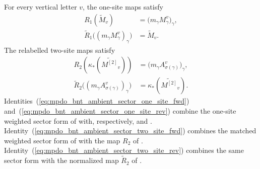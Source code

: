 \begin{lemma}
    \label{thm:mpdo_bnt_ambient_sector_tensor_letters}
    \leanok
    For every vertical letter $v$, the one-site maps satisfy
    \begin{align}
        R_1(\widetilde M_v)
         & =\bigl(m_\gamma M_\gamma^v\bigr)_\gamma,
        \label{eq:mpdo_bnt_ambient_sector_one_site_fwd}
        \\
        \widetilde R_1\bigl((m_\gamma M_\gamma^v)_\gamma\bigr)
         & =\widetilde M_v.
        \label{eq:mpdo_bnt_ambient_sector_one_site_rev}
    \end{align}
    The relabelled two-site maps satisfy
    \begin{align}
        R_2\!\left(\kappa_\ast(\widetilde{M^{[2]}}_v)\right)
         & =\bigl(m_\gamma A_{\sigma(\gamma)}^v\bigr)_\gamma,
        \label{eq:mpdo_bnt_ambient_sector_two_site_fwd}
        \\
        \widetilde R_2\bigl((m_\gamma A_{\sigma(\gamma)}^v)_\gamma\bigr)
         & =\kappa_\ast(\widetilde{M^{[2]}}_v).
        \label{eq:mpdo_bnt_ambient_sector_two_site_rev}
    \end{align}
    Identities~(\ref{eq:mpdo_bnt_ambient_sector_one_site_fwd}) and~(\ref{eq:mpdo_bnt_ambient_sector_one_site_rev}) combine the one-site weighted
    sector form of
    \cite[Appendix~C.4, lines~2048--2051]{Cirac2016MPDO_arXiv} with,
    respectively,
    \cite[Appendix~C.4, lines~2067--2068]{Cirac2016MPDO_arXiv} and
    \cite[Appendix~C.4, lines~2081--2083]{Cirac2016MPDO_arXiv}.
    Identity~(\ref{eq:mpdo_bnt_ambient_sector_two_site_fwd}) combines the matched weighted sector form of
    \cite[Appendix~C.4, lines~2048--2064]{Cirac2016MPDO_arXiv} with the map
    $R_2$ of \cite[Appendix~C.4, lines~2078--2079]{Cirac2016MPDO_arXiv}.
    Identity~(\ref{eq:mpdo_bnt_ambient_sector_two_site_rev}) combines the same sector form with the normalized map
    $\widetilde R_2$ of
    \cite[Appendix~C.4, lines~2070--2071]{Cirac2016MPDO_arXiv}.
\end{lemma}

